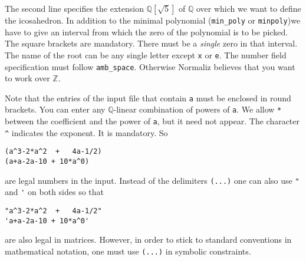 \documentclass[12pt,a4paper]{scrartcl}
\theoremstyle{definition}
\def\ZZ{{\mathbb Z}}
\def\QQ{{\mathbb Q}}
\begin{document}
\begin{minipage}[t]{0.4\textwidth}
\end{minipage}

The second line specifies the extension $\QQ[\sqrt 5]$ of $\QQ$ over which we want to define the icosahedron. In addition to the minimal polynomial (\verb|min_poly| or \verb|minpoly|)we have to give an interval from which the zero of the polynomial is to be picked. The square brackets are mandatory. There must be a \emph{single} zero in that interval. The name of the root can be any single letter except \verb|x| or \verb|e|. The number field specification must follow \verb|amb_space|. Otherwise Normaliz believes that you want to work over $\ZZ$.

Note that the entries of the input file that contain \verb|a| must be enclosed in round brackets. You can enter any $\QQ$-linear combination of powers of \verb|a|. We allow \verb|*| between the coefficient and the power of \verb|a|, but it need not appear. The character \verb|^| indicates the exponent. It is mandatory. So
\begin{Verbatim}
(a^3-2*a^2  +   4a-1/2)
(a+a-2a-10 + 10*a^0)
\end{Verbatim}
are legal numbers in the input. Instead of the delimiters \verb|(...)| one can also use \verb|"| and \verb|'| on both sides so that
\begin{Verbatim}
"a^3-2*a^2  +   4a-1/2"
'a+a-2a-10 + 10*a^0'
\end{Verbatim}
are also legal in matrices. However, in order to stick to standard conventions in mathematical notation, one must use \verb|(...)| in symbolic constraints.
\end{document}
